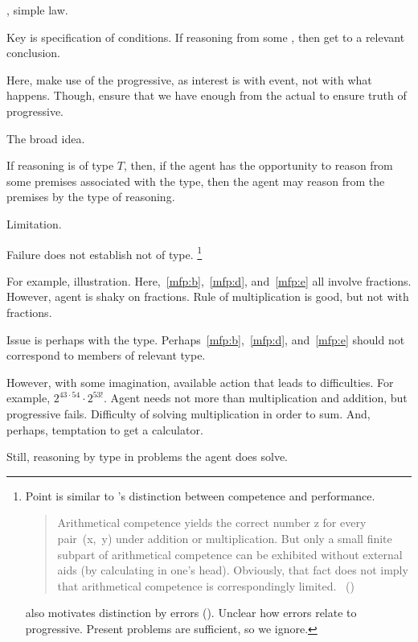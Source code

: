 \begin{note}
  , simple law.

  Key is specification of conditions.
  If reasoning from some \pool{}, then get to a relevant conclusion.

  Here, make use of the progressive, as interest is with event, not with what happens.
  Though, ensure that we have enough from the actual to ensure truth of progressive.
\end{note}

\begin{note}
  The broad idea.

  If reasoning is of type \(T\), then, if the agent has the opportunity to reason from some premises associated with the type, then the agent may reason from the premises by the type of reasoning.
\end{note}

\begin{note}
  Limitation.

  Failure does not establish not of type.%
  \footnote{
    Point is similar to \citeauthor{Chomsky:2015aa}'s distinction between competence and performance.

    \begin{quote}
    Arithmetical competence yields the correct number z for every pair~(x,~y) under addition or multiplication.
    But only a small finite subpart of arithmetical competence can be exhibited without external aids (by calculating in one's head).
    Obviously, that fact does not imply that arithmetical competence is correspondingly limited.%
    \mbox{ }\hfill\mbox{(\citeyear[xii]{Chomsky:2015aa})}
  \end{quote}

    \citeauthor{Chomsky:2015aa} also motivates distinction by errors (\citeyear[2]{Chomsky:2015aa}).
    Unclear how errors relate to progressive.
    Present problems are sufficient, so we ignore.
  }

  For example, illustration.
  Here,~\ref{mfp:b},~\ref{mfp:d}, and~\ref{mfp:e} all involve fractions.
  However, agent is shaky on fractions.
  Rule of multiplication is good, but not with fractions.

  Issue is perhaps with the type.
  Perhaps~\ref{mfp:b},~\ref{mfp:d}, and~\ref{mfp:e} should not correspond to members of relevant type.

  However, with some imagination, available action that leads to difficulties.
  For example, \(2^{43 \cdot 54} \cdot 2^{53!}\).
  Agent needs not more than multiplication and addition, but progressive fails.
  Difficulty of solving multiplication in order to sum.
  And, perhaps, temptation to get a calculator.

  Still, reasoning by type in problems the agent does solve.
\end{note}

